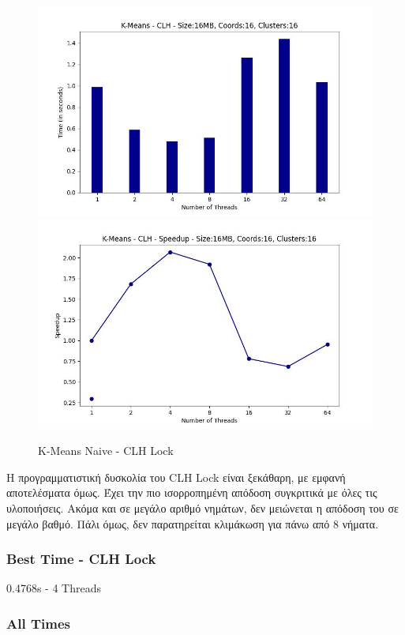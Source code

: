 \documentclass[../final_report.tex]{subfiles}
\begin{document}
\begin{figure}[H]
    \centering
        \includegraphics[scale=0.4]{outFilesCores/plots/kmeans_locks_clh.jpg}
        \includegraphics[scale=0.4]{outFilesCores/plots/kmeans_locks_clh_speedup.jpg}
    \caption{K-Means Naive - CLH Lock}
    \label{fig:K-Means Naive - CLH Lock}
\end{figure}

Η προγραμματιστική δυσκολία του CLH Lock είναι ξεκάθαρη, με εμφανή αποτελέσματα όμως. Έχει την πιο
ισορροπημένη απόδοση συγκριτικά με όλες τις υλοποιήσεις. Ακόμα και σε μεγάλο αριθμό νημάτων, δεν μειώνεται η 
απόδοση του σε μεγάλο βαθμό. Πάλι όμως, δεν παρατηρείται κλιμάκωση για πάνω από 8 νήματα. 

\subsubsection*{Best Time - CLH Lock}
0.4768s - 4 Threads

\subsubsection*{All Times}
\end{document}
